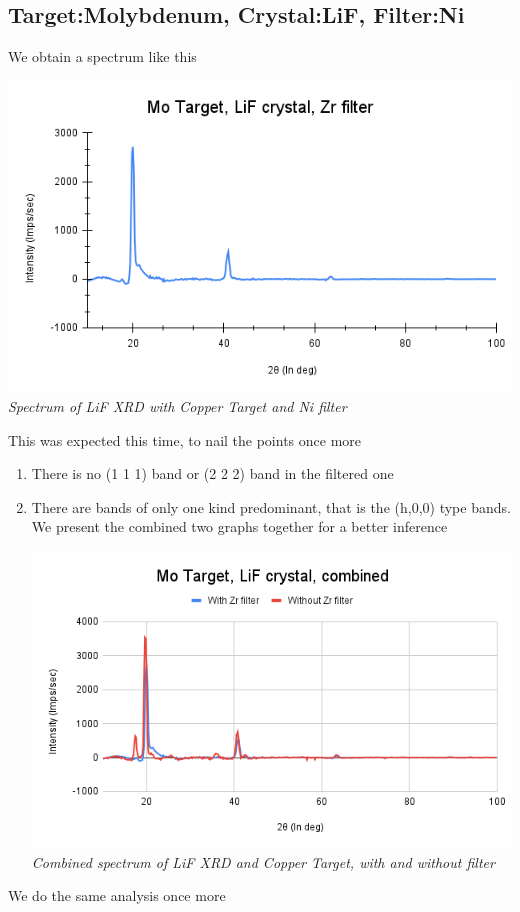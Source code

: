 \documentclass[]{report}[12 pt]
\begin{document}
\subsection*{Target:Molybdenum, Crystal:LiF, Filter:Ni}
We obtain a spectrum like this\\
\begin{center}
	\includegraphics[width=10 cm]{a3.png}\\
	\textit{Spectrum of LiF XRD with Copper Target and Ni filter}
\end{center}
This was expected this time, to nail the points once more
\begin{enumerate}
	\item There is no (1 1 1) band or (2 2 2) band in the filtered one
	\item There are bands of only one kind predominant, that is the (h,0,0) type bands. We present the combined two graphs together for a better inference
	\begin{center}
		\includegraphics[width=10 cm]{comb2.png}\\
		\textit{Combined spectrum of LiF XRD and Copper Target, with and without filter}
	\end{center}
\end{enumerate}

We do the same analysis once more
\end{document}
